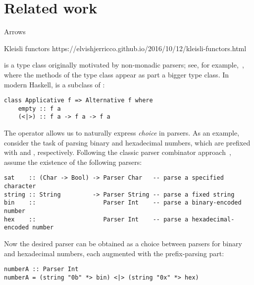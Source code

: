 \section{Related work}\label{sec-related}

Arrows

Kleisli functors
https://elvishjerricco.github.io/2016/10/12/kleisli-functors.html

 is a type class originally motivated by non-monadic parsers;
see, for example,~\citet{swierstra1996parsers}, where the methods of the
 type class appear as part a bigger  type class. In
modern Haskell,  is a subclass of :

\vspace{1mm}
\begin{verbatim}
class Applicative f => Alternative f where
    empty :: f a
    (<|>) :: f a -> f a -> f a
\end{verbatim}
\vspace{1mm}

\noindent
The operator \hs{<|>} allows us to naturally express \emph{choice} in parsers.
As an example, consider the task of parsing binary and hexadecimal numbers,
which are prefixed with  and , respectively. Following the
classic parser combinator approach~\citep{hutton1998monadic}, assume the
existence of the following parsers:

\vspace{1mm}
\begin{verbatim}
sat    :: (Char -> Bool) -> Parser Char   -- parse a specified character
string :: String         -> Parser String -- parse a fixed string
bin    ::                   Parser Int    -- parse a binary-encoded number
hex    ::                   Parser Int    -- parse a hexadecimal-encoded number
\end{verbatim}
\vspace{1mm}

\noindent
Now the desired parser can be obtained as a choice between parsers for binary
and hexadecimal numbers, each augmented with the prefix-parsing part:

\vspace{1mm}
\begin{verbatim}
numberA :: Parser Int
numberA = (string "0b" *> bin) <|> (string "0x" *> hex)
\end{verbatim}
\vspace{1mm}

